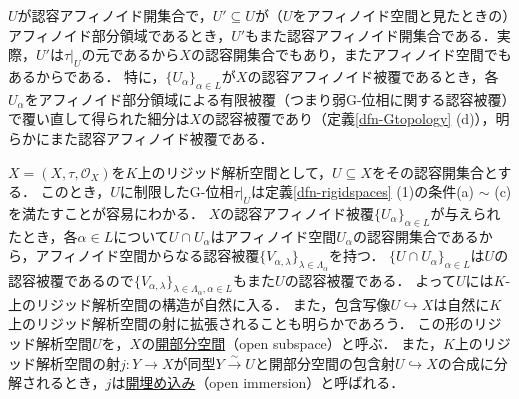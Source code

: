 \documentclass[a4paper,12pt, dvipdfmx]{jsbook}
\def\O{\mathscr{O}}
\theoremstyle{plain}
\theoremstyle{definition}
\begin{document}
$U$が認容アフィノイド開集合で，$U'\subseteq U$が（$U$をアフィノイド空間と見たときの）アフィノイド部分領域であるとき，$U'$もまた認容アフィノイド開集合である．実際，$U'$は$\tau|_U$の元であるから$X$の認容開集合でもあり，またアフィノイド空間でもあるからである．
特に，$\{U_{\alpha}\}_{\alpha\in L}$が$X$の認容アフィノイド被覆であるとき，各$U_{\alpha}$をアフィノイド部分領域による有限被覆（つまり弱G-位相に関する認容被覆）で覆い直して得られた細分は$X$の認容被覆であり（定義\ref{dfn-Gtopology} (d)），明らかにまた認容アフィノイド被覆である．

$X=(X,\tau,\O_X)$を$K$上のリジッド解析空間として，$U\subseteq X$をその認容開集合とする．
このとき，$U$に制限したG-位相$\tau|_U$は定義\ref{dfn-rigidspaces} (1)の条件(a) $\sim$ (c)を満たすことが容易にわかる．
$X$の認容アフィノイド被覆$\{U_{\alpha}\}_{\alpha\in L}$が与えられたとき，各$\alpha\in L$について$U\cap U_{\alpha}$はアフィノイド空間$U_{\alpha}$の認容開集合であるから，アフィノイド空間からなる認容被覆$\{V_{\alpha,\lambda}\}_{\lambda\in\Lambda_{\alpha}}$を持つ．
$\{U\cap U_{\alpha}\}_{\alpha\in L}$は$U$の認容被覆であるので$\{V_{\alpha,\lambda}\}_{\lambda\in\Lambda_{\alpha},\alpha\in L}$もまた$U$の認容被覆である．
よって$U$には$K$-上のリジッド解析空間の構造が自然に入る．
また，包含写像$U\hookrightarrow X$は自然に$K$上のリジッド解析空間の射に拡張されることも明らかであろう．
この形のリジッド解析空間$U$を，$X$の\underline{開部分空間}（open subspace）と呼ぶ．
また，$K$上のリジッド解析空間の射$j\colon Y\rightarrow X$が同型$Y\stackrel{\sim}{\rightarrow}U$と開部分空間の包含射$U\hookrightarrow X$の合成に分解されるとき，$j$は\underline{開埋め込み}（open immersion）と呼ばれる．
\end{document}
